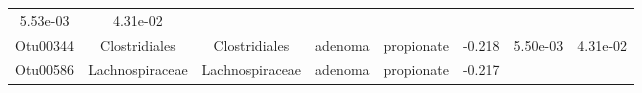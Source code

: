 \documentclass[11pt,]{article}
\begin{document}
\begin{longtable}[]{@{}cccccccc@{}}
\begin{minipage}[t]{0.08\columnwidth}
5.53e-03\strut
\end{minipage} & \begin{minipage}[t]{0.08\columnwidth}\centering\strut
4.31e-02\strut
\end{minipage}\tabularnewline
\begin{minipage}[t]{0.08\columnwidth}\centering\strut
Otu00344\strut
\end{minipage} & \begin{minipage}[t]{0.15\columnwidth}\centering\strut
Clostridiales\strut
\end{minipage} & \begin{minipage}[t]{0.15\columnwidth}\centering\strut
Clostridiales\strut
\end{minipage} & \begin{minipage}[t]{0.08\columnwidth}\centering\strut
adenoma\strut
\end{minipage} & \begin{minipage}[t]{0.09\columnwidth}\centering\strut
propionate\strut
\end{minipage} & \begin{minipage}[t]{0.07\columnwidth}\centering\strut
-0.218\strut
\end{minipage} & \begin{minipage}[t]{0.08\columnwidth}\centering\strut
5.50e-03\strut
\end{minipage} & \begin{minipage}[t]{0.08\columnwidth}\centering\strut
4.31e-02\strut
\end{minipage}\tabularnewline
\begin{minipage}[t]{0.08\columnwidth}\centering\strut
Otu00586\strut
\end{minipage} & \begin{minipage}[t]{0.15\columnwidth}\centering\strut
Lachnospiraceae\strut
\end{minipage} & \begin{minipage}[t]{0.15\columnwidth}\centering\strut
Lachnospiraceae\strut
\end{minipage} & \begin{minipage}[t]{0.08\columnwidth}\centering\strut
adenoma\strut
\end{minipage} & \begin{minipage}[t]{0.09\columnwidth}\centering\strut
propionate\strut
\end{minipage} & \begin{minipage}[t]{0.07\columnwidth}\centering\strut
-0.217\strut
\end{minipage} & \begin{minipage}[t]{0.08\columnwidth}\centering\strut

\end{minipage}
\end{longtable}
\end{document}
